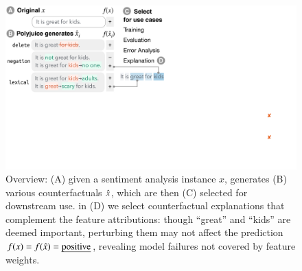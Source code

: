 
\begin{figure}[t]
\centering
\includegraphics[trim={0 18cm 30.5cm 0cm},clip, width=1\columnwidth]{figures/teaser.pdf}
\vspace{-15pt}
\caption{
Overview: (A) given a sentiment analysis instance $x$, \sysname generates (B) various counterfactuals $\hat{x}$, which are then (C) selected for downstream use.
\eg in (D) we select counterfactual explanations that complement the feature attributions: though ``great'' and ``kids'' are deemed important, perturbing them may not affect the prediction $f(x)=f(\hat{x})=\text{\emph{positive}}$, revealing model failures not covered by feature weights.\footnotemark
}
\vspace{-12pt}
\label{fig:teaser}
\end{figure} 


